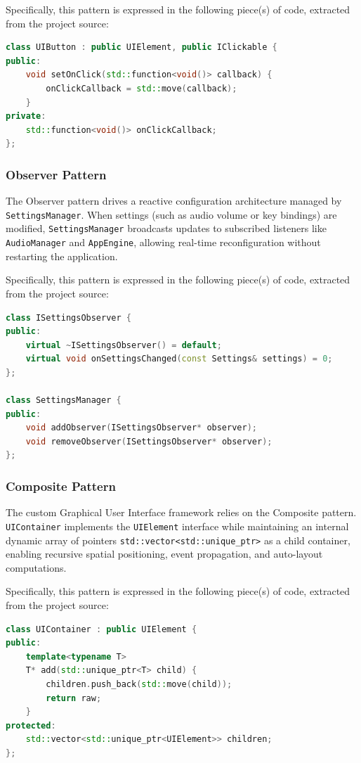 \documentclass[12pt, a4paper]{article}
\begin{document}
Specifically, this pattern is expressed in the following piece(s) of code, extracted from the project source:

\begin{lstlisting}[language=C++]
class UIButton : public UIElement, public IClickable {
public:
    void setOnClick(std::function<void()> callback) { 
        onClickCallback = std::move(callback); 
    }
private:
    std::function<void()> onClickCallback;
};
\end{lstlisting}

\subsubsection{Observer Pattern}
The Observer pattern drives a reactive configuration architecture managed by \texttt{SettingsManager}. When settings (such as audio volume or key bindings) are modified, \texttt{SettingsManager} broadcasts updates to subscribed listeners like \texttt{AudioManager} and \texttt{AppEngine}, allowing real-time reconfiguration without restarting the application.

Specifically, this pattern is expressed in the following piece(s) of code, extracted from the project source:

\begin{lstlisting}[language=C++]
class ISettingsObserver {
public:
    virtual ~ISettingsObserver() = default;
    virtual void onSettingsChanged(const Settings& settings) = 0;
};

class SettingsManager {
public:
    void addObserver(ISettingsObserver* observer);
    void removeObserver(ISettingsObserver* observer);
};
\end{lstlisting}

\subsubsection{Composite Pattern}
The custom Graphical User Interface framework relies on the Composite pattern. \texttt{UIContainer} implements the \texttt{UIElement} interface while maintaining an internal dynamic array of pointers \texttt{std::vector<std::unique\_ptr>} as a child container, enabling recursive spatial positioning, event propagation, and auto-layout computations.

Specifically, this pattern is expressed in the following piece(s) of code, extracted from the project source:

\begin{lstlisting}[language=C++]
class UIContainer : public UIElement {
public:
    template<typename T>
    T* add(std::unique_ptr<T> child) {
        children.push_back(std::move(child));
        return raw;
    }
protected:
    std::vector<std::unique_ptr<UIElement>> children;
};
\end{lstlisting}
\end{document}
